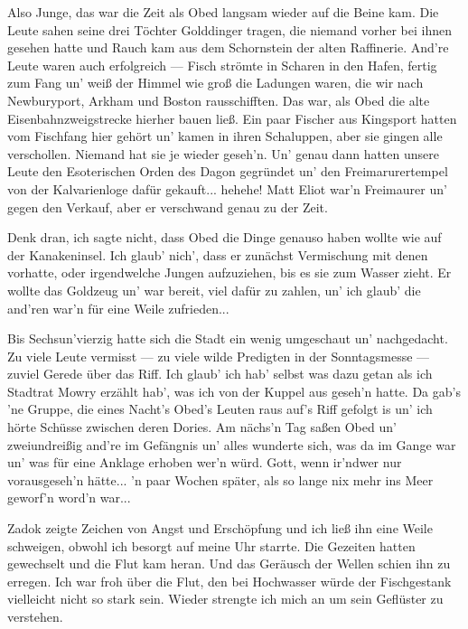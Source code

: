 Also Junge, das war die Zeit als Obed langsam wieder auf die Beine kam. Die Leute sahen seine drei Töchter Golddinger tragen, die niemand vorher bei ihnen gesehen hatte und Rauch kam aus dem Schornstein der alten Raffinerie. And're Leute waren auch erfolgreich --- Fisch strömte in Scharen in den Hafen, fertig zum Fang un' weiß der Himmel wie groß die Ladungen waren, die wir nach Newburyport, Arkham und Boston rausschifften. Das war, als Obed die alte Eisenbahnzweigstrecke hierher bauen ließ. Ein paar Fischer aus Kingsport hatten vom Fischfang hier gehört un' kamen in ihren Schaluppen, aber sie gingen alle verschollen. Niemand hat sie je wieder geseh'n. Un' genau dann hatten unsere Leute den Esoterischen Orden des Dagon gegründet un' den Freimarurertempel von der Kalvarienloge dafür gekauft... hehehe! Matt Eliot war'n Freimaurer un' gegen den Verkauf, aber er verschwand genau zu der Zeit.

Denk dran, ich sagte nicht, dass Obed die Dinge genauso haben wollte wie auf der Kanakeninsel. Ich glaub' nich', dass er zunächst Vermischung mit denen vorhatte, oder irgendwelche Jungen aufzuziehen, bis es sie zum Wasser zieht. Er wollte das Goldzeug un' war bereit, viel dafür zu zahlen, un' ich glaub' die and'ren war'n für eine Weile zufrieden...

Bis Sechsun'vierzig hatte sich die Stadt ein wenig umgeschaut un' nachgedacht. Zu viele Leute vermisst --- zu viele wilde Predigten in der Sonntagsmesse --- zuviel Gerede über das Riff. Ich glaub' ich hab' selbst was dazu getan als ich Stadtrat Mowry erzählt hab', was ich von der Kuppel aus geseh'n hatte. Da gab's 'ne Gruppe, die eines Nacht's Obed's Leuten raus auf's Riff gefolgt is un' ich hörte Schüsse zwischen deren Dories. Am nächs'n Tag saßen Obed un' zweiundreißig and're im Gefängnis un' alles wunderte sich, was da im Gange war un' was für eine Anklage erhoben wer'n würd. Gott, wenn ir'ndwer nur vorausgeseh'n hätte... 'n paar Wochen später, als so lange nix mehr ins Meer geworf'n word'n war...\grqq

Zadok zeigte Zeichen von Angst und Erschöpfung und ich ließ ihn eine Weile schweigen, obwohl ich besorgt auf meine Uhr starrte. Die Gezeiten hatten gewechselt und die Flut kam heran. Und das Geräusch der Wellen schien ihn zu erregen. Ich war froh über die Flut, den bei Hochwasser würde der Fischgestank vielleicht nicht so stark sein. Wieder strengte ich mich an um sein Geflüster zu verstehen.

